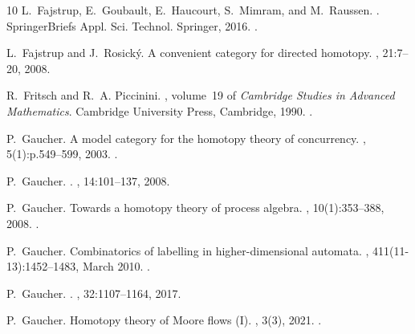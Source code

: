 \documentclass[a4paper,12pt]{amsart}
\theoremstyle{definition}
\begin{document}
\begin{thebibliography}{10}
	L.~Fajstrup, E.~Goubault, E.~Haucourt, S.~Mimram, and M.~Raussen.
	.
	\newblock SpringerBriefs Appl. Sci. Technol. Springer, 2016.
	\newblock \href {https://doi.org/10.1007/978-3-319-15398-8}
	{}.
	
	L.~Fajstrup and J.~Rosick{\'y}.
	\newblock A convenient category for directed homotopy.
	, 21:7--20, 2008.
	
	R.~Fritsch and R.~A. Piccinini.
	, volume~19 of {\em Cambridge
		Studies in Advanced Mathematics}.
	\newblock Cambridge University Press, Cambridge, 1990.
	\newblock \href {https://doi.org/10.1017/cbo9780511983948}
	{}.
	
	P.~Gaucher.
	\newblock A model category for the homotopy theory of concurrency.
	, 5(1):p.549--599, 2003.
	\newblock \href {https://doi.org/10.4310/hha.2003.v5.n1.a20}
	{}.
	
	P.~{Gaucher}.
	.
	, 14:101--137, 2008.
	
	P.~Gaucher.
	\newblock Towards a homotopy theory of process algebra.
	, 10(1):353--388, 2008.
	\newblock \href {https://doi.org/10.4310/HHA.2008.v10.n1.a16}
	{}.
	
	P.~Gaucher.
	\newblock Combinatorics of labelling in higher-dimensional automata.
	, 411(11-13):1452--1483, March 2010.
	\newblock \href {https://doi.org/10.1016/j.tcs.2009.11.013}
	{}.
	
	P.~{Gaucher}.
	.
	, 32:1107--1164, 2017.
	
	P.~Gaucher.
	\newblock Homotopy theory of {M}oore flows ({I}).
	, 3(3), 2021.
	\newblock \href {https://doi.org/10.32408/compositionality-3-3}
	{}.
	

\end{thebibliography}
\end{document}
